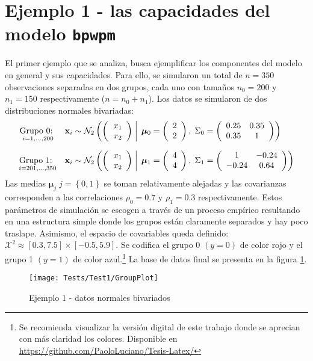 \documentclass[../Main/Main.tex]{subfiles}
\begin{document}
\section{Ejemplo 1 - las capacidades del modelo \texttt{bpwpm} } \label{sec:T1}
El primer ejemplo que se analiza, busca ejemplificar los componentes del modelo en general y sus capacidades. Para ello, se simularon un total de $n = 350$ observaciones separadas en dos grupos, cada uno con tamaños $n_{0} = 200$ y  $n_{1} = 150$ respectivamente ($n = n_0 + n_1$). Los datos se simularon de dos distribuciones normales bivariadas:
\begin{align*}
\underset{i = 1,\ldots,200}{\text{Grupo 0: }} \quad 
&\xsn_i \sim \normbivar{2}{2}{0.25}{0.35}{1}{0} \\[6pt]
\underset{i = 201,\ldots,350}{\text{Grupo 1: }} \quad 
&\xsn_i \sim \normbivar{4}{4}{1}{-0.24}{0.64}{1} 
\end{align*}
Las medias $\bm{\mu}_j \; j = \left\{0,1\right\}$ se toman relativamente alejadas y las covarianzas corresponden a las correlaciones $\rho_0 = 0.7$ y $\rho_1 = 0.3$ respectivamente. Estos parámetros de simulación se escogen a través de un proceso empírico resultando en una estructura simple donde los grupos están claramente separados y hay poco traslape. Asimismo, el espacio de covariables queda definido: $\mathcal{X}^2 \approx [0.3,7.5]\times[-0.5,5.9]$. Se codifica el grupo 0 $(y = 0)$ de color rojo y el grupo 1 $(y = 1)$ de color azul.\footnote{Se recomienda visualizar la versión digital de este trabajo donde se aprecian con más claridad los colores. Disponible en \url{https://github.com/PaoloLuciano/Tesis-Latex/}} La base de datos final se presenta en la figura \ref{fig:Test1Plot}.
\begin{figure}[h]
  \centering
      \texttt{[image: Tests/Test1/GroupPlot]}
  \caption{Ejemplo 1 - datos normales bivariados}
 \label{fig:Test1Plot}
\end{figure}
\end{document}
